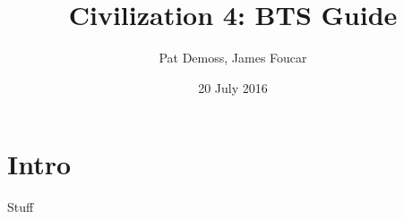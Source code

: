 \documentclass[10pt]{article}
\title{Civilization 4: BTS Guide}
\author{Pat Demoss, James Foucar}
\date{20 July 2016}
\begin{document}
\section*{Intro}

Stuff
\end{document}
